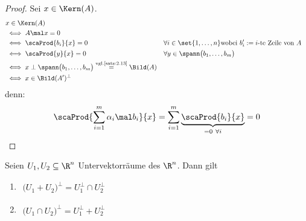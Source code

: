\begin{proof}
	Sei $x\in\Kern(A)$.
	\begin{align*}
		&x\in\Kern(A)\\
		&\iff A\mal x=0\\
		&\iff\scaProd{b_i}{x}=0 &&\forall i\in\set{1,\ldots,n}\text{wobei $b_i':=i$-te Zeile von $A$}\\
		&\iff\scaProd{y}{x}=0 &&\forall y\in\spann\big(b_1,\ldots,b_m\big)\\
		&\iff x\perp\spann\big(b_1,\ldots,b_m\big)
		\overset{\text{vgl.\ref{satz:2.13}}}{=}		
		\Bild(A)\\
		&\iff x\in\Bild(A')^\perp
	\end{align*}
	denn:
	\begin{align*}
		\scaProd{\sum\limits_{i=1}^m \alpha_i\mal b_i}{x}=\sum\limits_{i=1}^m\underbrace{\scaProd{b_i}{x}}_{=0~\forall i}=0
	\end{align*}
\end{proof}

\begin{satz}\label{satz:2.18}
	Seien $U_1,U_2\subseteq\R^n$ Untervektorräume des $\R^n$.
	Dann gilt
	\begin{enumerate}[label=(\arabic*)]
		\item $\begin{aligned}
			\big(U_1+U_2\big)^\perp=U_1^\perp\cap U_2^\perp
			\label{item:satz2.18(1)}
		\end{aligned}$
		\item $\begin{aligned}
			\big(U_1\cap U_2\big)^\perp=U_1^\perp+ U_2^\perp
			\label{item:satz2.18(2)}
		\end{aligned}$
	\end{enumerate}
\end{satz}

